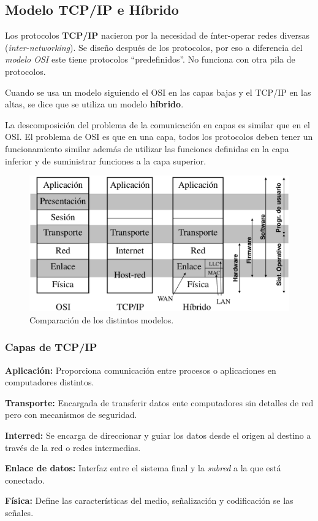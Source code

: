 \documentclass[10pt,a4paper]{article}
\begin{document}
\subsection{Modelo TCP/IP e Híbrido}

Los protocolos \textbf{TCP/IP} nacieron por la necesidad de ínter-operar redes diversas (\textit{inter-networking}). Se diseño después de los protocolos, por eso a diferencia del \textit{modelo OSI} este tiene protocolos ``predefinidos''. No funciona con otra pila de protocolos.

Cuando se usa un modelo siguiendo el OSI en las capas bajas y el TCP/IP en las altas, se dice que se utiliza un modelo \textbf{híbrido}.

La descomposición del problema de la comunicación en capas es similar que en el OSI. El problema de OSI es que en una capa, todos los protocolos deben tener un funcionamiento similar además de utilizar las funciones definidas en la capa inferior y de suministrar funciones a la capa superior.

\begin{figure}
  \caption{Comparación de los distintos modelos.}
  \label{fig:comparacion_modelos}  
  \centering
  \hbox{\includegraphics[width=0.7\textwidth-\fboxrule-\fboxrule]{imgs/comparacion_modelos.png}}  
\end{figure}

\subsubsection{Capas de TCP/IP}
\begin{description}
\item \textbf{Aplicación:} Proporciona comunicación entre procesos o aplicaciones en computadores distintos.
\item \textbf{Transporte:} Encargada de transferir datos ente computadores sin detalles de red pero con mecanismos de seguridad.
\item \textbf{Interred:} Se encarga de direccionar y guiar los datos desde el origen al destino a través de la red o redes intermedias.
\item \textbf{Enlace de datos:} Interfaz entre el sistema final y la \textit{subred} a la que está conectado.
\item \textbf{Física:} Define las características del medio, señalización y codificación se las señales.
\end{description}
\end{document}
